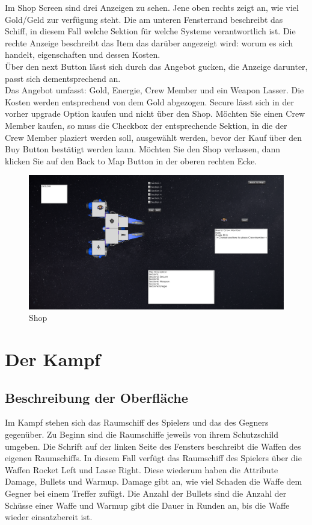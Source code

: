 \documentclass[fontsize=12pt,paper=a4,twoside]{scrartcl}
\begin{document}
Im Shop Screen sind drei Anzeigen zu sehen. Jene oben rechts zeigt an, wie viel Gold/Geld zur verfügung steht. Die am unteren Fensterrand beschreibt das Schiff, in diesem Fall welche Sektion für welche Systeme verantwortlich ist. Die rechte Anzeige beschreibt das Item das darüber angezeigt wird: worum es sich handelt, eigenschaften und dessen Kosten.\\
Über den next Button lässt sich durch das Angebot gucken, die Anzeige darunter, passt sich dementsprechend an.\\
Das Angebot umfasst: Gold, Energie, Crew Member und ein Weapon Lasser. Die Kosten werden entsprechend von dem Gold abgezogen. Secure lässt sich in der vorher upgrade Option kaufen und nicht über den Shop. Möchten Sie einen Crew Member kaufen, so muss die Checkbox der entsprechende Sektion, in die der Crew Member plaziert werden soll, ausgewählt werden, bevor der Kauf über den Buy Button bestätigt werden kann. Möchten Sie den Shop verlassen, dann klicken Sie auf den Back to Map Button in der oberen rechten Ecke. 

\begin{figure}[htp]
	\centering
	\includegraphics[width=1.00\linewidth]{pics/shopScreen.png} %
	\caption{Shop}
	\label{fig1}
\end{figure}

\section{Der Kampf}

\subsection{Beschreibung der Oberfläche}
Im Kampf stehen sich das Raumschiff des Spielers und das des Gegners gegenüber.
Zu Beginn sind die Raumschiffe jeweils von ihrem Schutzschild umgeben.
Die Schrift auf der linken Seite des Fensters beschreibt die Waffen des eigenen Raumschiffs.
In diesem Fall verfügt das Raumschiff des Spielers über die Waffen Rocket Left und Lasse Right.
Diese wiederum haben die Attribute Damage, Bullets und Warmup. Damage gibt an, wie viel Schaden die Waffe dem Gegner bei einem Treffer zufügt. Die Anzahl der Bullets sind
die Anzahl der Schüsse einer Waffe und Warmup gibt die Dauer in Runden an, bis die Waffe wieder einsatzbereit ist.\\
\end{document}
